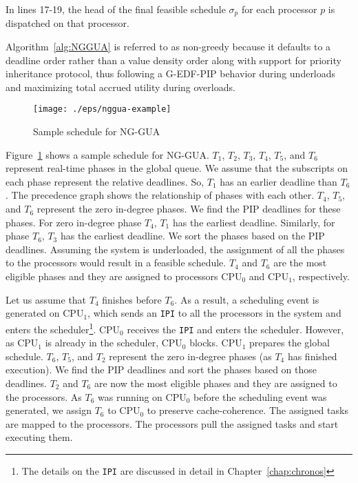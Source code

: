 \documentclass[12pt,dvips]{report}
\begin{document}
In lines 17-19, the head of the final feasible schedule $\sigma_p$ for each processor $p$ is dispatched on that processor.

Algorithm~\ref{alg:NGGUA} is referred to as non-greedy because it defaults to a deadline order rather than a value density order along with support for priority inheritance protocol, thus following a G-EDF-PIP  behavior during underloads and maximizing total accrued utility during overloads.

\begin{figure} [htbp]
  \centering
  \texttt{[image: ./eps/nggua-example]}
  \caption{Sample schedule for NG-GUA}
  \label{fig:nggua-sample-sched}
\end{figure}

Figure~\ref{fig:nggua-sample-sched} shows a sample schedule for NG-GUA. $T_1$, $T_2$, $T_3$, $T_4$, $T_5$, and $T_6$ represent real-time phases in the global queue. We assume that the subscripts on each phase represent the relative deadlines. So, $T_1$ has an earlier deadline than $T_6$. The precedence graph shows the relationship of phases with each other. $T_4$, $T_5$, and $T_6$ represent the zero in-degree phases. We find the PIP deadlines for these phases. For zero in-degree phase $T_4$, $T_1$ has the earliest deadline. Similarly, for phase $T_6$, $T_3$ has the earliest deadline. We sort the phases based on the PIP deadlines. Assuming the system is underloaded, the assignment of all the phases to the processors would result in a feasible schedule. $T_4$ and $T_6$ are the most eligible phases and they are assigned to processors CPU$_0$ and CPU$_1$, respectively. 

Let us assume that $T_4$ finishes before $T_6$. As a result, a scheduling event is generated on CPU$_1$, which sends an \texttt{IPI} to all the processors in the system and enters the scheduler\footnote{The details on the \texttt{IPI} are discussed in detail in Chapter~\ref{chap:chronos}}. CPU$_0$ receives the \texttt{IPI} and enters the scheduler. However, as CPU$_1$ is already in the scheduler, CPU$_0$ blocks. CPU$_1$ prepares the global schedule. $T_6$, $T_5$, and $T_2$ represent the zero in-degree phases (as $T_4$ has finished execution). We find the PIP deadlines and sort the phases based on those deadlines. $T_2$ and $T_6$ are now the most eligible phases and they are assigned to the processors. As $T_6$ was running on CPU$_0$ before the scheduling event was generated, we assign $T_6$ to CPU$_0$ to preserve cache-coherence. The assigned tasks are mapped to the processors. The processors pull the assigned tasks and start executing them.
\end{document}
